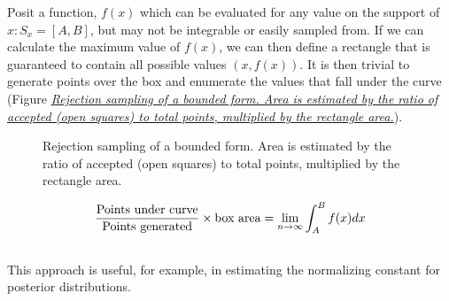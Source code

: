 \documentclass[letterpaper,10pt,english]{sphinxmanual}
\begin{document}
Posit a function, $f(x)$ which can be evaluated for any value on the support of $x:S_x = [A,B]$, but may not be integrable or easily sampled from. If we can calculate the maximum  value of $f(x)$, we can then define a rectangle that is guaranteed to contain all possible values $(x,f(x))$. It is then trivial to generate points over the box and enumerate the values that fall under the curve (Figure {\hyperref[theory:bound]{\emph{Rejection sampling of a bounded form. Area is estimated by the ratio of
accepted (open squares) to total points, multiplied by the rectangle
area.}}}).
\begin{figure}[htbp]
\centering
\capstart

\caption{Rejection sampling of a bounded form. Area is estimated by the ratio of
accepted (open squares) to total points, multiplied by the rectangle
area.}\label{theory:bound}\end{figure}
\begin{gather}
\begin{split}\frac{\mbox{Points under curve}}{\mbox{Points generated}} \times \mbox{box area} = \lim_{n \to \infty} \int_A^B f(x) dx\end{split}\notag\\\begin{split}\end{split}\notag
\end{gather}
This approach is useful, for example, in estimating the normalizing constant for posterior distributions.
\end{document}
